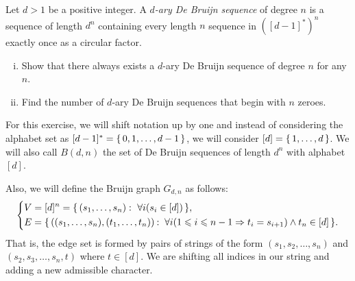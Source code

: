 \documentclass[12pt]{memoir}
\begin{document}
\begin{Ej}[Exercise 2]
    Let $d>1$ be a positive integer. A \emph{$d$-ary De Bruijn sequence} of degree $n$ is a sequence of length $d^n$ containing every length $n$ sequence in $([d-1]^\ast)^n$ exactly once as a circular factor.
    \begin{enumerate}[i)]
        \itemsep=-0.4em 
        \item Show that there always exists a $d$-ary De Bruijn sequence of degree $n$ for any $n$.
        \item Find the number of $d$-ary De Bruijn sequences that begin with $n$ zeroes. 
    \end{enumerate}
\end{Ej}
\begin{nonum-Rmk}
For this exercise, we will shift notation up by one and instead of considering the alphabet set as $[d-1]^\ast=\{\,0,1,\dots,d-1\,\}$, we will consider $[d]=\{\,1,\dots,d\,\}$. We will also call $B(d,n)$ the set of De Bruijn sequences of length $d^n$ with alphabet $[d]$.\par 
Also, we will define the Bruijn graph $G_{d,n}$ as follows: 
$$
\left\lbrace
\begin{aligned}
    &V=[d]^n=\{\,(s_1,\dots,s_n):\ \forall i(s_i\in[d])\,\},\\
    &E=\{\,((s_1,\dots,s_n),(t_1,\dots,t_n))\mathbin{:}\ \forall i(1\leqslant i\leqslant n-1\Rightarrow t_i=s_{i+1})\land t_n\in[d]\,\}.\\
\end{aligned}
\right.
$$
That is, the edge set is formed by pairs of strings of the form $(s_1,s_2,\dots,s_n)$ and $(s_2,s_3,\dots,s_n,t)$ where $t\in[d]$. We are shifting all indices in our string and adding a new admissible character.
\end{nonum-Rmk}
\end{document}
